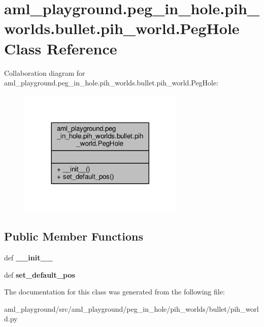 \hypertarget{classaml__playground_1_1peg__in__hole_1_1pih__worlds_1_1bullet_1_1pih__world_1_1_peg_hole}{\section{aml\-\_\-playground.\-peg\-\_\-in\-\_\-hole.\-pih\-\_\-worlds.\-bullet.\-pih\-\_\-world.\-Peg\-Hole Class Reference}
\label{classaml__playground_1_1peg__in__hole_1_1pih__worlds_1_1bullet_1_1pih__world_1_1_peg_hole}
}


Collaboration diagram for aml\-\_\-playground.\-peg\-\_\-in\-\_\-hole.\-pih\-\_\-worlds.\-bullet.\-pih\-\_\-world.\-Peg\-Hole\-:
\nopagebreak
\begin{figure}[H]
\begin{center}
\leavevmode
\includegraphics[width=224pt]{classaml__playground_1_1peg__in__hole_1_1pih__worlds_1_1bullet_1_1pih__world_1_1_peg_hole__coll__graph}
\end{center}
\end{figure}
\subsection*{Public Member Functions}
\begin{DoxyCompactItemize}
\item 
\hypertarget{classaml__playground_1_1peg__in__hole_1_1pih__worlds_1_1bullet_1_1pih__world_1_1_peg_hole_a8761d09c7fb05eec0d391ed64db2aa89}{def {\bfseries \-\_\-\-\_\-init\-\_\-\-\_\-}}\label{classaml__playground_1_1peg__in__hole_1_1pih__worlds_1_1bullet_1_1pih__world_1_1_peg_hole_a8761d09c7fb05eec0d391ed64db2aa89}

\item 
\hypertarget{classaml__playground_1_1peg__in__hole_1_1pih__worlds_1_1bullet_1_1pih__world_1_1_peg_hole_a76e0018bf9d3b3aec413dff87023069e}{def {\bfseries set\-\_\-default\-\_\-pos}}\label{classaml__playground_1_1peg__in__hole_1_1pih__worlds_1_1bullet_1_1pih__world_1_1_peg_hole_a76e0018bf9d3b3aec413dff87023069e}

\end{DoxyCompactItemize}


The documentation for this class was generated from the following file\-:\begin{DoxyCompactItemize}
\item 
aml\-\_\-playground/src/aml\-\_\-playground/peg\-\_\-in\-\_\-hole/pih\-\_\-worlds/bullet/pih\-\_\-world.\-py\end{DoxyCompactItemize}
